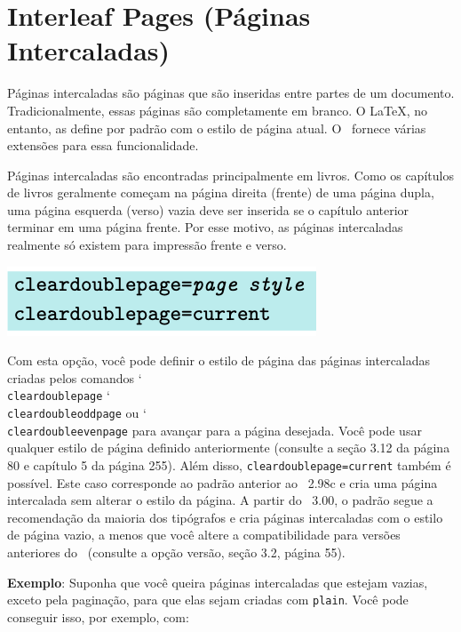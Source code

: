 \chapter[Interleaf Pages]{Interleaf Pages (Páginas Intercaladas)}

Páginas intercaladas são páginas que são inseridas entre partes de um documento. Tradicionalmente, essas páginas são completamente em branco. O \LaTeX, no entanto, as define por padrão com o estilo de página atual. O \KOMAScript\ fornece várias extensões para essa funcionalidade.

Páginas intercaladas são encontradas principalmente em livros. Como os capítulos de livros geralmente começam na página direita (frente) de uma página dupla, uma página esquerda (verso) vazia deve ser inserida se o capítulo anterior terminar em uma página frente. Por esse motivo, as páginas intercaladas realmente só existem para impressão frente e verso.
\begin{center}
    \includegraphics[width=0.5\linewidth]{imagens/imagem15.png}
\end{center}
Com esta opção, você pode definir o estilo de página das páginas intercaladas criadas pelos comandos \char`\\\texttt{clear\-dou\-ble\-pa\-ge} \char`\\\texttt{clear\-dou\-ble\-odd\-pa\-ge}  ou \char`\\\texttt{clear\-dou\-ble\-e\-ven\-pa\-ge} para avançar para a página desejada. Você pode usar qualquer estilo de página definido anteriormente (consulte a seção 3.12 da página 80 e capítulo 5 da página 255). Além disso, \texttt{clear\-dou\-ble\-pa\-ge=cur\-rent} também é possível. Este caso corresponde ao padrão anterior ao \KOMAScript~2.98c e cria uma página intercalada sem alterar o estilo da página. A partir do \KOMAScript~3.00, o padrão segue a recomendação da maioria dos tipógrafos e cria páginas intercaladas com o estilo de página vazio, a menos que você altere a compatibilidade para versões anteriores do \KOMAScript\ (consulte a opção versão, seção 3.2, página 55).

\textbf{Exemplo}: Suponha que você queira páginas intercaladas que estejam vazias, exceto pela paginação, para que elas sejam criadas com \texttt{plain}. Você pode conseguir isso, por exemplo, com:

